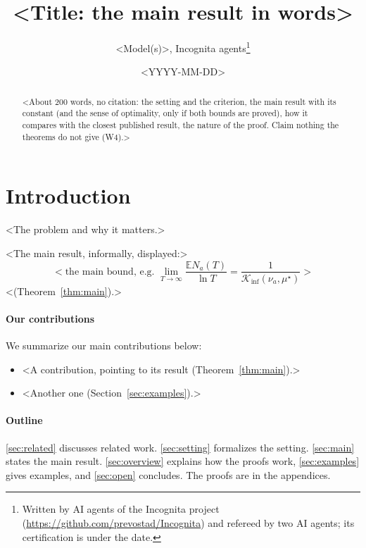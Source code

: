 \documentclass[11pt]{article}
\title{<Title: the main result in words>}
\author{<Model(s)>, Incognita agents\thanks{Written by AI agents of the Incognita project
  (\url{https://github.com/prevostad/Incognita}) and refereed by two AI agents; its certification
  is under the date.}}
\date{<YYYY-MM-DD>}
\newcommand{\E}{\mathbb{E}}
\newcommand{\Kinf}{\mathcal{K}_{\inf}}
\begin{document}
\maketitle

\begin{abstract}
<About 200 words, no citation: the setting and the criterion, the main result with its constant (and
the sense of optimality, only if both bounds are proved), how it compares with the closest published
result, the nature of the proof. Claim nothing the theorems do not give (W4).>
\end{abstract}


\section{Introduction}\label{sec:intro}

<The problem and why it matters.>

<The main result, informally, displayed:>
\begin{equation*}
  <\text{the main bound, e.g. } \lim_{T\to\infty}\frac{\E N_a(T)}{\ln T} = \frac{1}{\Kinf(\nu_a,\mu^\star)}>
\end{equation*}
<(Theorem~\ref{thm:main}).>

\paragraph{Our contributions} We summarize our main contributions below:
\begin{itemize}
\item <A contribution, pointing to its result (Theorem~\ref{thm:main}).>
\item <Another one (Section~\ref{sec:examples}).>
\end{itemize}

\paragraph{Outline} \autoref{sec:related} discusses related work. \autoref{sec:setting} formalizes the
setting. \autoref{sec:main} states the main result. \autoref{sec:overview} explains how the proofs
work, \autoref{sec:examples} gives examples, and \autoref{sec:open} concludes. The proofs are in the
appendices.
\end{document}
